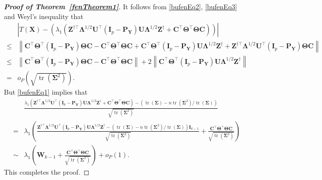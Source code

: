 \documentclass[12pt]{article} %
\DeclareMathOperator{\mytr}{tr}
\newcommand{\bZ}{\mathbf{Z}}
\newcommand{\bX}{\mathbf{X}}
\newcommand{\bP}{\mathbf{P}}
\newcommand{\bY}{\mathbf{Y}}
\newcommand{\bC}{\mathbf{C}}
\newcommand{\bI}{\mathbf{I}}
\newcommand{\bU}{\mathbf{U}}
\newcommand{\bW}{\mathbf{W}}
\newcommand{\bfsym}[1]{\ensuremath{\boldsymbol{#1}}}
\def\bLambda {\bfsym {\Lambda}}
\def\bSigma {\bfsym {\Sigma}}
\def\bTheta {\bfsym {\Theta}}
\theoremstyle{definition}
\begin{document}
\begin{appendices}
\begin{proof}[\textbf{Proof of Theorem~\ref{fenTheorem1}}]
It follows from \eqref{bufenEq2}, \eqref{bufenEq3} and Weyl's inequality that
\begin{equation*}
    \begin{split}
        &\left|
        T(\bX)-
        \left(
        \lambda_1\left(
\bZ^{\dagger \top} \bLambda^{1/2}\bU^\top (\bI_p-\bP_{\bY})\bU\bLambda^{1/2}\bZ^{\dagger}+
 \bC^\top \bTheta^\top \bTheta \bC
        \right)
    \right)
        \right|
        \\
        \leq
        &
 \left\|
 \bC^\top \bTheta^\top (\bI_p -\bP_{\bY})\bTheta \bC
 -
 \bC^\top \bTheta^\top \bTheta \bC
 +
  \bC^\top \bTheta^\top (\bI_p -\bP_{\bY})\bU\bLambda^{1/2}\bZ^{\dagger}+
 \bZ^{\dagger \top} \bLambda^{1/2}\bU^\top (\bI_p-\bP_{\bY})\bTheta \bC
 \right\|
 \\
 \leq&
 \left\|
 \bC^\top \bTheta^\top (\bI_p -\bP_{\bY})\bTheta \bC
 -
 \bC^\top \bTheta^\top \bTheta \bC
 \right\|
 +
 2\left\|
  \bC^\top \bTheta^\top (\bI_p -\bP_{\bY})\bU\bLambda^{1/2}\bZ^{\dagger}
 \right\|
 \\
=&o_P\left(
\sqrt{\mytr(\bSigma^2)}
\right)
 .
    \end{split}
\end{equation*}
But \eqref{bufenEq1} implies that
\begin{equation*}
    \begin{split}
&\frac{
        \lambda_1\left(
\bZ^{\dagger \top} \bLambda^{1/2}\bU^\top (\bI_p-\bP_{\bY})\bU\bLambda^{1/2}\bZ^{\dagger}+
 \bC^\top \bTheta^\top \bTheta \bC
 \right)
 -\left(\mytr(\bSigma)-{n\mytr(\bSigma^2)}/{\mytr(\bSigma)}\right)
 }{
     \sqrt{\mytr(\bSigma^2)}
 }
 \\
    =&
    \lambda_1\left(
    \frac{
     \bZ^{\dagger\top} \bLambda^{1/2} \bU^\top (\bI_p-\bP_{\bY})\bU\bLambda^{1/2}\bZ^{\dagger}
 -\left(\mytr(\bSigma)-{n\mytr(\bSigma^2)}/{\mytr(\bSigma)}\right)\bI_{k-1} 
 }{
     \sqrt{\mytr(\bSigma^2)}
 }
 +
 \frac{\bC^\top \bTheta^\top \bTheta \bC}{
     \sqrt{\mytr(\bSigma^2)}
 }
 \right)
 \\
 \sim& \lambda_1\left(\bW_{k-1}+
 \frac{\bC^\top \bTheta^\top \bTheta \bC}{
     \sqrt{\mytr(\bSigma^2)}
 }
 \right)+o_P(1).
    \end{split}
\end{equation*}
This completes the proof.

    
\end{proof}










\end{appendices}
\end{document}
